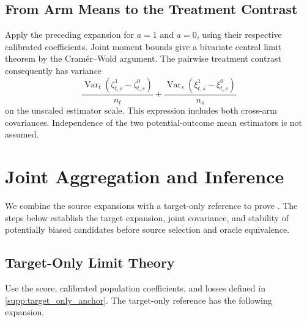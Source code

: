 \documentclass[12pt]{article}
\begin{document}
\subsection{From Arm Means to the Treatment Contrast}\label{supp:pairwise_control_tate}
Apply the preceding expansion for $a=1$ and $a=0$, using their respective calibrated coefficients. Joint moment bounds give a bivariate central limit theorem by the Cram\'er--Wold argument. The pairwise treatment contrast consequently has variance
\[
\frac{\operatorname{Var}_t(\zeta_{t,s}^1-\zeta_{t,s}^0)}{n_t}
+\frac{\operatorname{Var}_s(\xi_{t,s}^1-\xi_{t,s}^0)}{n_s}
\]
on the unscaled estimator scale. This expression includes both cross-arm covariances. Independence of the two potential-outcome mean estimators is not assumed.

\section{Joint Aggregation and Inference}\label{supp:aggregation}
We combine the source expansions with a target-only reference to prove . The steps below establish the target expansion, joint covariance, and stability of potentially biased candidates before source selection and oracle equivalence.

\subsection{Target-Only Limit Theory}\label{supp:target_only_limit}
Use the score, calibrated population coefficients, and losses defined in \cref{supp:target_only_anchor}. The target-only reference has the following expansion.
\end{document}
